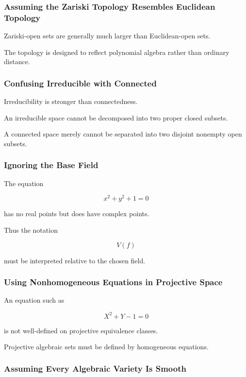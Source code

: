 \subsubsection{Assuming the Zariski Topology Resembles Euclidean Topology}

Zariski-open sets are generally much larger than Euclidean-open sets.

The topology is designed to reflect polynomial algebra rather than ordinary
distance.

\subsubsection{Confusing Irreducible with Connected}

Irreducibility is stronger than connectedness.

An irreducible space cannot be decomposed into two proper closed subsets.

A connected space merely cannot be separated into two disjoint nonempty
open subsets.

\subsubsection{Ignoring the Base Field}

The equation

\[
x^2+y^2+1=0
\]

has no real points but does have complex points.

Thus the notation

\[
V(f)
\]

must be interpreted relative to the chosen field.

\subsubsection{Using Nonhomogeneous Equations in Projective Space}

An equation such as

\[
X^2+Y-1=0
\]

is not well-defined on projective equivalence classes.

Projective algebraic sets must be defined by homogeneous equations.

\subsubsection{Assuming Every Algebraic Variety Is Smooth}

